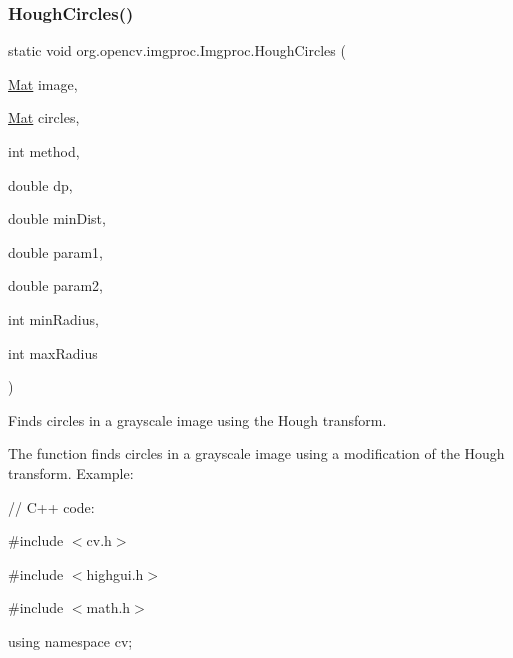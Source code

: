 \subsubsection{\texorpdfstring{Hough\+Circles()}{HoughCircles()}\hspace{0.1cm}{\footnotesize\ttfamily [1/2]}}
{\footnotesize\ttfamily static void org.\+opencv.\+imgproc.\+Imgproc.\+Hough\+Circles (\begin{DoxyParamCaption}\item[{\mbox{\hyperlink{classorg_1_1opencv_1_1core_1_1_mat}{Mat}}}]{image,  }\item[{\mbox{\hyperlink{classorg_1_1opencv_1_1core_1_1_mat}{Mat}}}]{circles,  }\item[{int}]{method,  }\item[{double}]{dp,  }\item[{double}]{min\+Dist,  }\item[{double}]{param1,  }\item[{double}]{param2,  }\item[{int}]{min\+Radius,  }\item[{int}]{max\+Radius }\end{DoxyParamCaption})\hspace{0.3cm}{\ttfamily [static]}}

Finds circles in a grayscale image using the Hough transform.

The function finds circles in a grayscale image using a modification of the Hough transform. Example\+: {\ttfamily }

{\ttfamily }

{\ttfamily }

{\ttfamily // C++ code\+:}

{\ttfamily }

{\ttfamily }

{\ttfamily \#include $<$cv.\+h$>$}

{\ttfamily }

{\ttfamily }

{\ttfamily \#include $<$highgui.\+h$>$}

{\ttfamily }

{\ttfamily }

{\ttfamily \#include $<$math.\+h$>$}

{\ttfamily }

{\ttfamily }

{\ttfamily using namespace cv;}

{\ttfamily }

{\ttfamily }

